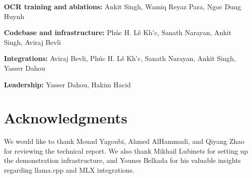 \documentclass[11pt, a4paper]{article}
\begin{document}
\noindent\textbf{OCR training and ablations:}
 Ankit Singh, Wamiq Reyaz Para, Ngoc Dung Huynh

\noindent\textbf{Codebase and infrastructure:}
Phúc H. Lê Kh\'\abreve{}c, Sanath Narayan, Ankit Singh, Aviraj Bevli

\noindent\textbf{Integrations:}
Aviraj Bevli, Phúc H. Lê Kh\'\abreve{}c, Sanath Narayan, Ankit Singh, Yasser Dahou

\noindent\textbf{Leadership:}
Yasser Dahou, Hakim Hacid

\section*{Acknowledgments}
We would like to thank Mouad Yagoubi, Ahmed AlHammadi, and Qiyang Zhao for reviewing the technical report. We also thank Mikhail Lubinets for setting up the demonstration infrastructure, and Younes Belkada for his valuable insights regarding llama.cpp and MLX integrations.


\vspace{4em}



\clearpage
\appendix

\end{document}
